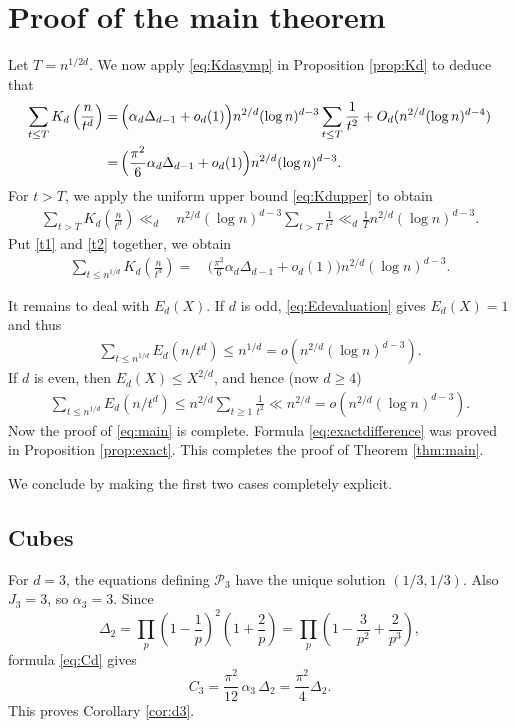 \documentclass[12pt,a4paper,reqno]{amsart}
\numberwithin{equation}{section}
\newcommand{\cP}{\mathcal P}
\newcommand{\1}{\mathbf 1}
\theoremstyle{plain}
\theoremstyle{definition}
\begin{document}
\section{Proof of the main theorem}

Let $T=n^{1/2d}$. We now apply \eqref{eq:Kdasymp} in Proposition \ref{prop:Kd} to deduce that
\begin{align}\label{t1}\sum_{t\leq T}K_d\left(\frac{n}{t^d}\right)
 =&\, \Big(\alpha_d\Delta_{d-1}+o_{d}(1)\Big)
 n^{2/d}(\log n)^{d-3}\sum_{t\leq T}\frac{1}{t^2}+O_d(n^{2/d}(\log n)^{d-4})\notag
 \\ 
 =&\, \Big(\frac{\pi^2}{6}\alpha_d\Delta_{d-1}+o_{d}(1)\Big)
 n^{2/d}(\log n)^{d-3}.\end{align}
For $t>T$, we apply the uniform upper bound \eqref{eq:Kdupper} to obtain
\begin{align}\label{t2}\sum_{t>T}K_d\left(\frac{n}{t^d}\right)
 \ll_d &\, 
 n^{2/d}(\log n)^{d-3}\sum_{t>T}\frac{1}{t^2}\ll_d \frac{1}{T}
 n^{2/d}(\log n)^{d-3}.\end{align}
Put \eqref{t1} and \eqref{t2} together, we obtain
\begin{align*}\sum_{t\leq n^{1/d}}K_d\left(\frac{n}{t^d}\right)
 =&\, \Big(\frac{\pi^2}{6}\alpha_d\Delta_{d-1}+o_{d}(1)\Big)
 n^{2/d}(\log n)^{d-3}.\end{align*}

It remains to deal with $E_d(X)$.  If
$d$ is odd, \eqref{eq:Edevaluation} gives $E_d(X)=1$ and thus
\begin{align*}
 \sum_{t\leq n^{1/d}}E_d(n/t^d)\leq n^{1/d}=o(n^{2/d}(\log n)^{d-3}).
\end{align*}
If $d$ is even, then $E_d(X)\leq X^{2/d}$, and hence (now $d\geq 4$)
\begin{align*}
 \sum_{t\leq n^{1/d}}E_d(n/t^d)
 \leq n^{2/d}\sum_{t\geq1}\frac1{t^2}
 \ll n^{2/d}=o(n^{2/d}(\log n)^{d-3}).
\end{align*}
Now the proof of
\eqref{eq:main} is complete.  Formula
\eqref{eq:exactdifference} was proved in Proposition
\ref{prop:exact}.  This completes the proof of Theorem
\ref{thm:main}.

\medskip

We conclude by making the first two cases completely explicit.
\subsection{Cubes}
For $d=3$, the equations defining $\cP_3$ have the unique solution
$(1/3,1/3)$.  Also $J_3=3$, so $\alpha_3=3$.  Since
\[
 \Delta_2
 =\prod_p\left(1-\frac1p\right)^2\left(1+\frac2p\right)
 =\prod_p\left(1-\frac3{p^2}+\frac2{p^3}\right),
\]
formula \eqref{eq:Cd} gives
\[
 C_3=\frac{\pi^2}{12}\,\alpha_3\,\Delta_{2}
 =\frac{\pi^2}{4}\Delta_2.
\]
This proves Corollary
\ref{cor:d3}.
\end{document}
